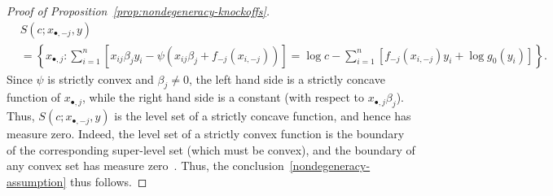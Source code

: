 \documentclass[ejs]{imsart}
\numberwithin{equation}{section}
\theoremstyle{plain}
\theoremstyle{definition}
\theoremstyle{remark}
\newcommand{\srx}{X}
\newcommand{\sfx}{x}
\newcommand{\srxk}{\widetilde X}
\newcommand{\sry}{Y}
\newcommand{\sfy}{y}
\begin{document}
\begin{proof}[Proof of Proposition~\ref{prop:nondegeneracy-knockoffs}]
\begin{equation}
	\begin{split}
	&S(c; \sfx_{\bullet,-j}, \sfy) \\
	&= \left\{x_{\bullet,j}: \sum_{i = 1}^n [\sfx_{ij}\beta_j \sfy_i  - \psi(\sfx_{ij} \beta_j + f_{-j}(\sfx_{i,-j}))] =  \log c- \sum_{i = 1}^n [f_{-j}(\sfx_{i,-j})\sfy_i  + \log g_0(\sfy_i)]\right\}. 
	\end{split}
	\label{likelihood-expression}
	\end{equation}
	Since $\psi$ is strictly convex and $\beta_j \neq 0$, the left hand side is a strictly concave function of $x_{\bullet,j}$, while the right hand side is a constant (with respect to $x_{\bullet,j}\beta_j$). Thus, $S(c; \sfx_{\bullet,-j}, \sfy)$ 
	is the level set of a strictly concave function, and hence has measure zero. Indeed, the level set of a strictly convex function is the boundary of the corresponding super-level set (which must be convex), and the boundary of any convex set has measure zero~\cite{Lang1986}. Thus, the  conclusion~\eqref{nondegeneracy-assumption} thus follows.
	
	

\end{proof}
\end{document}
